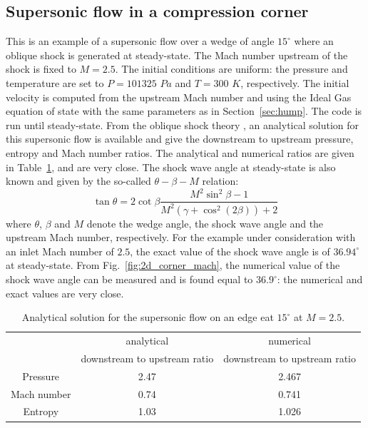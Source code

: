 \documentclass[preprint,10pt]{elsarticle}
\newcommand{\fig}[1]{Fig.~\ref{#1}}                      %
\newcommand{\tbl}[1]{Table~\ref{#1}}                     %
\newcommand{\sct}[1]{Section~\ref{#1}}                   %
\begin{document}
\subsection{Supersonic flow in a compression corner} \label{sec:corner}
This is an example of a supersonic flow over a wedge of angle $15^{\circ}$ where an oblique shock is generated at steady-state. The Mach number upstream of the shock is fixed to $M=2.5$. The initial conditions are uniform: the pressure and temperature are set to $P=101325$ $Pa$ and $T=300$ $K$, respectively. The initial velocity is computed from the upstream Mach number and using the Ideal Gas equation of state with the same parameters as in \sct{sec:hump}. The code is run until steady-state. From the oblique shock theory \cite{CompressionCorner}, an analytical solution for this supersonic flow is available and give the downstream to upstream pressure, entropy and Mach number ratios. The analytical and numerical ratios are given in \tbl{tbl:corner_exact_sol}, and are very close. The shock wave angle at steady-state is also known and given by the so-called $\theta -\beta -M$ relation:
\begin{equation}
\tan \theta = 2 \cot \beta \frac{M^2 \sin^2 \beta -1}{M^2 \left(\gamma+\cos^2 (2\beta)\right)+2} \nonumber
\end{equation}
where $\theta$, $\beta$ and $M$ denote the wedge angle, the shock wave angle and the upstream Mach number, respectively. For the example under consideration with an inlet Mach number of $2.5$, the exact value of the shock wave angle is of $36.94^{\circ}$ at steady-state. From \fig{fig:2d_corner_mach}, the numerical value of the shock wave angle can be measured and is found equal to $36.9^{\circ}$: the numerical and exact values are very close.
\begin{table}[H]
\begin{center}
 \caption{\label{tbl:corner_exact_sol} Analytical solution for the supersonic flow on an edge eat $15^{\circ}$ at $M=2.5$.}
 \begin{tabular}{|c|c|c|}
 \hline
   & analytical & numerical \\
    & downstream to upstream ratio & downstream to upstream ratio \\
 \hline
Pressure & 2.47 & 2.467\\
  \hline
Mach number  &  0.74 & 0.741\\
   \hline
  Entropy & 1.03 & 1.026\\ 
  \hline 
\end{tabular}
\end{center}
\nonumber
\end{table}
\end{document}
